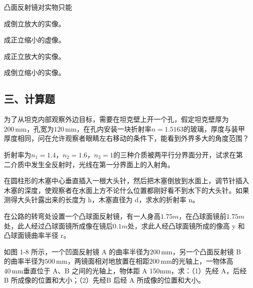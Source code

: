 \documentclass[standard, analysis, notocnum]{ExBook}
\newcommand{\answerarea}[1][8cm]{%
  \par\vspace{2mm}%
  \noindent{\color{themeColor!35}\rule{\linewidth}{0.4pt}}\par
  \noindent\begin{minipage}[t][#1][t]{\linewidth}\vspace{0pt}\end{minipage}\par
  \noindent{\color{themeColor!35}\rule{\linewidth}{0.4pt}}\par
}
\begin{document}
\begin{qitems}
\begin{bbox}
\qitem 凸面反射镜对实物只能
\par\noindent\hspace{2em}成倒立放大的实像。
\par\noindent\hspace{2em}成正立缩小的虚像。
\par\noindent\hspace{2em}成正立放大的实像。
\par\noindent\hspace{2em}成倒立缩小的实像。
\answerarea[3.5cm]
\end{bbox}
\end{qitems}

\subsection{三、计算题}
\begin{qitems}[startnum=1]
\qitem 为了从坦克内部观察外边目标，需要在坦克壁上开一个孔，假定坦克壁厚为$200\,\mathrm{mm}$，孔宽为$120\,\mathrm{mm}$，在孔内安装一块折射率$n=1.5163$的玻璃，厚度与装甲厚度相同，问在允许观察者眼睛左右移动的条件下，能看到外界多大的角度范围？
\label{q:10:start}
\answerarea[8cm]
\label{q:10:end}
\end{qitems}

\begin{qitems}[startnum=2]
\qitem 折射率为$n_{1}=1.4$，$n_{2}=1.6$，$n_{3}=1$的三种介质被两平行分界面分开，试求在第二介质中发生全反射时，光线在第一分界面上的入射角。
\label{q:11:start}
\answerarea[8cm]
\label{q:11:end}
\end{qitems}

\begin{qitems}[startnum=3]
\qitem 在圆柱形的木塞中心垂直插入一根大头针，然后把木塞倒放到水面上，调节针插入木塞的深度，使观察者在水面上方不论什么位置都刚好看不到水下的大头针。如果测得大头针露出来的长度为 h，木塞直径为 d，求水的折射率 n。
\label{q:12:start}
\answerarea[8cm]
\label{q:12:end}
\end{qitems}

\begin{qitems}[startnum=4]
\qitem 在公路的转弯处设置一个凸球面反射镜，有一人身高$1.75m$，在凸球面镜前$1.75m$处，此人经过凸球面镜所成像在镜后$0.1m$处，求此人经凸球面镜所成的像高 y 和凸球面镜曲率半径 r。
\label{q:13:start}
\answerarea[8cm]
\label{q:13:end}
\end{qitems}

\begin{qitems}[startnum=5]
\qitem 如图 1-8 所示，一个凹面反射镜 A 的曲率半径为$200\,\mathrm{mm}$，另一个凸面反射镜 B 的曲率半径为$500\,\mathrm{mm}$，两镜面相对地放置在相距$200\,\mathrm{mm}$的光轴上，一物体高$40\,\mathrm{mm}$垂直位于 A、B 之间的光轴上，物体距 A 150mm，求：（1）先经 A，后经 B 所成像的位置和大小；（2）先经B 后经 A 所成像的位置和大小。
\label{q:14:start}
\answerarea[8cm]
\label{q:14:end}
\end{qitems}
\end{document}
